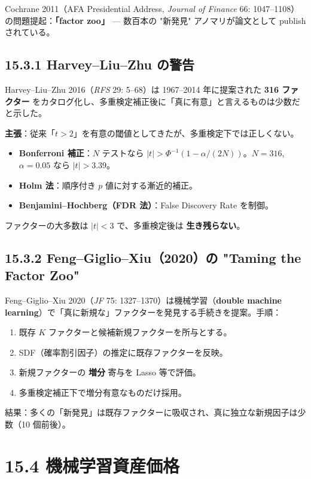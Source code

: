 \documentclass[11pt,a4paper]{report}
\begin{document}
Cochrane 2011（AFA Presidential Address, \emph{Journal of Finance} 66: 1047–1108）の問題提起：\textbf{「factor zoo」} — 数百本の "新発見" アノマリが論文として publish されている。

\subsection{15.3.1 Harvey–Liu–Zhu の警告}

Harvey–Liu–Zhu 2016（\emph{RFS} 29: 5–68）は 1967–2014 年に提案された \textbf{316 ファクター} をカタログ化し、多重検定補正後に「真に有意」と言えるものは少数だと示した。

\textbf{主張}：従来「$t > 2$」を有意の閾値としてきたが、多重検定下では正しくない。
\begin{itemize}
\item \textbf{Bonferroni 補正}：$N$ テストなら $|t| > \Phi^{-1}(1 - \alpha/(2N))$。$N = 316$, $\alpha = 0.05$ なら $|t| > 3.39$。
\item \textbf{Holm 法}：順序付き $p$ 値に対する漸近的補正。
\item \textbf{Benjamini–Hochberg（FDR 法）}：False Discovery Rate を制御。
\end{itemize}

ファクターの大多数は $|t| < 3$ で、多重検定後は \textbf{生き残らない}。

\subsection{15.3.2 Feng–Giglio–Xiu（2020）の "Taming the Factor Zoo"}

Feng–Giglio–Xiu 2020（\emph{JF} 75: 1327–1370）は機械学習（\textbf{double machine learning}）で「真に新規な」ファクターを発見する手続きを提案。手順：

\begin{enumerate}
\item 既存 $K$ ファクターと候補新規ファクターを所与とする。
\item SDF（確率割引因子）の推定に既存ファクターを反映。
\item 新規ファクターの \textbf{増分} 寄与を Lasso 等で評価。
\item 多重検定補正下で増分有意なものだけ採用。
\end{enumerate}

結果：多くの「新発見」は既存ファクターに吸収され、真に独立な新規因子は少数（10 個前後）。

\section{15.4 機械学習資産価格}
\end{document}
